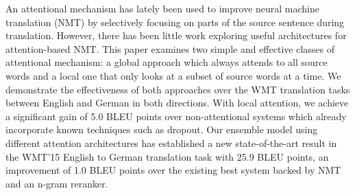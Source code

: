 An attentional mechanism has lately been used to improve neural machine translation (NMT) by selectively focusing on parts of the source sentence during translation. However, there has been little work exploring useful architectures for attention-based NMT. This paper examines two simple and effective classes of attentional mechanism: a global approach which always attends to all source words and a local one that only looks at a subset of source words at a time. We demonstrate the effectiveness of both approaches over the WMT translation tasks between English and German in both directions. With local attention, we achieve a significant gain of 5.0 BLEU points over non-attentional systems which already incorporate known techniques such as dropout. Our ensemble model using different attention architectures has established a new state-of-the-art result in the WMT'15 English to German translation task with 25.9 BLEU points, an improvement of 1.0 BLEU points over the existing best system backed by NMT and an n-gram reranker.
